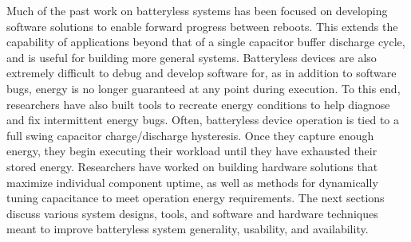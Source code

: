 Much of the past work on batteryless systems has been focused on developing software solutions to enable forward progress between reboots. This extends the capability of applications beyond that of a single capacitor buffer discharge cycle, and is useful for building more general systems.
Batteryless devices are also extremely difficult to debug and develop software for, as in addition to software bugs, energy is no longer guaranteed at any point during execution.
To this end, researchers have also built tools to recreate energy conditions to help diagnose and fix intermittent energy bugs.
Often, batteryless device operation is tied to a full swing capacitor charge/discharge hysteresis. Once they capture enough energy, they begin executing their workload until they have exhausted their stored energy. Researchers have worked on building hardware solutions that maximize individual component uptime, as well as methods for dynamically tuning capacitance to meet operation energy requirements.
The next sections discuss various system designs, tools, and software and hardware techniques meant to improve batteryless system generality, usability, and availability.

